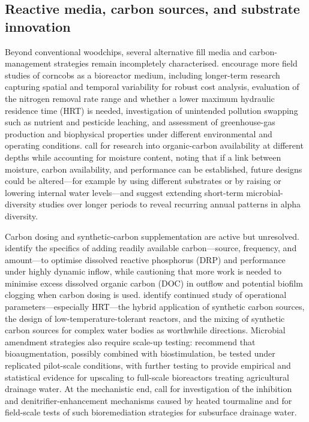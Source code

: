 \documentclass[11pt]{article}
\begin{document}
\subsection{Reactive media, carbon sources, and substrate innovation}
Beyond conventional woodchips, several alternative fill media and carbon-management strategies remain incompletely characterised. \textcite{Law2023} encourage more field studies of corncobs as a bioreactor medium, including longer-term research capturing spatial and temporal variability for robust cost analysis, evaluation of the nitrogen removal rate range and whether a lower maximum hydraulic residence time (HRT) is needed, investigation of unintended pollution swapping such as nutrient and pesticide leaching, and assessment of greenhouse-gas production and biophysical properties under different environmental and operating conditions. \textcite{Porter2015} call for research into organic-carbon availability at different depths while accounting for moisture content, noting that if a link between moisture, carbon availability, and performance can be established, future designs could be altered---for example by using different substrates or by raising or lowering internal water levels---and suggest extending short-term microbial-diversity studies over longer periods to reveal recurring annual patterns in alpha diversity.

Carbon dosing and synthetic-carbon supplementation are active but unresolved. \textcite{Rivas2020} identify the specifics of adding readily available carbon---source, frequency, and amount---to optimise dissolved reactive phosphorus (DRP) and performance under highly dynamic inflow, while cautioning that more work is needed to minimise excess dissolved organic carbon (DOC) in outflow and potential biofilm clogging when carbon dosing is used. \textcite{Zhang2021b} identify continued study of operational parameters---especially HRT---the hybrid application of synthetic carbon sources, the design of low-temperature-tolerant reactors, and the mixing of synthetic carbon sources for complex water bodies as worthwhile directions. Microbial amendment strategies also require scale-up testing: \textcite{Jeglot2022} recommend that bioaugmentation, possibly combined with biostimulation, be tested under replicated pilot-scale conditions, with further testing to provide empirical and statistical evidence for upscaling to full-scale bioreactors treating agricultural drainage water. At the mechanistic end, \textcite{Ma2021} call for investigation of the inhibition and denitrifier-enhancement mechanisms caused by heated tourmaline and for field-scale tests of such bioremediation strategies for subsurface drainage water.
\end{document}
